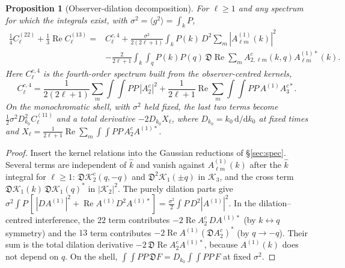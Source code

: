 \documentclass[11pt]{article}
\newtheorem{proposition}[theorem]{Proposition}
\theoremstyle{definition}
\theoremstyle{remark}
\newcommand{\dd}{\mathrm{d}}
\newcommand{\ens}[1]{\langle #1\rangle}
\begin{document}
\begin{proposition}[Observer-dilation decomposition]\label{prop:obs-dilation}
For $\ell\ge1$ and any spectrum for which the integrals exist, with $\sigma^2=\ens{g^2}=\int_kP$,
\begin{equation}\label{eq:obs-dilation}
\boxed{\begin{aligned}
\frac14C^{(22)}_\ell+\frac13\operatorname{Re}C^{(13)}_\ell
={}&C^{c,4}_\ell
+\frac{\sigma^2}{2(2\ell+1)}\int_kP(k)\,D^2\sum_m|A^{(1)}_{\ell m}(k)|^2\\
&-\frac{2}{2\ell+1}\int_k\!\int_qP(k)P(q)\,\mathfrak D\operatorname{Re}\sum_mA^c_{2,\ell m}(k,q)A^{(1)*}_{\ell m}(k).
\end{aligned}}
\end{equation}
Here $C^{c,4}_\ell$ is the fourth-order spectrum built from the observer-centred kernels,
\[
C^{c,4}_\ell=\frac{1}{2(2\ell+1)}\sum_m\int\!\!\int PP\,|A^c_2|^2+\frac1{2\ell+1}\operatorname{Re}\sum_m\int\!\!\int PP\,A^{(1)}A^{c*}_3 .
\]
On the monochromatic shell, with $\sigma^2$ held fixed, the last two terms become
$\frac12\sigma^2D_{k_0}^2C^{(11)}_\ell$ and a total derivative $-2D_{k_0}X_\ell$, where
$D_{k_0}=k_0\,\dd/\dd k_0$ at fixed times and
$X_\ell=\frac1{2\ell+1}\operatorname{Re}\sum_m\int\!\!\int PP\,A^c_2A^{(1)*}$.
\end{proposition}
\begin{proof}
Insert the kernel relations into the Gaussian reductions of \S\ref{sec:spec}. Several terms
are independent of $\hat k$ and vanish against $A^{(1)}_{\ell m}(k)$ after the $\hat k$ integral
for $\ell\ge1$: $\mathfrak D\mathcal K^c_2(q,-q)$ and $\mathfrak D^2\mathcal K_1(\pm q)$ in
$\mathcal K_3$, and the cross term $\mathfrak D\mathcal K_1(k)\,\mathfrak D\mathcal K_1(q)^*$ in
$|\mathcal K_2|^2$. The purely dilation parts give
$\sigma^2\int P\,[\,|DA^{(1)}|^2+\operatorname{Re}A^{(1)}D^2A^{(1)*}]=\frac{\sigma^2}2\int P\,D^2|A^{(1)}|^2$.
In the dilation--centred interference, the $22$ term contributes
$-2\operatorname{Re}A^c_2\,DA^{(1)*}$ (by $k\leftrightarrow q$ symmetry) and the $13$ term
contributes $-2\operatorname{Re}A^{(1)}(\mathfrak DA^c_2)^*$ (by $q\to-q$). Their sum is the
total dilation derivative $-2\,\mathfrak D\operatorname{Re}A^c_2A^{(1)*}$, because $A^{(1)}(k)$
does not depend on $q$. On the shell,
$\int\!\!\int PP\,\mathfrak DF=D_{k_0}\int\!\!\int PP\,F$ at fixed $\sigma^2$.
\end{proof}
\end{document}
